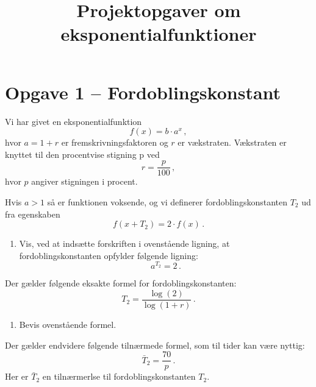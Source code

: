 \documentclass[12pt,oneside,a4paper]{article}
\title{Projektopgaver om eksponentialfunktioner}
\date{\vspace{-5ex}}
\theoremstyle{plain}
\begin{document}
\maketitle

\section*{Opgave 1 -- Fordoblingskonstant}
Vi har givet en eksponentialfunktion
\[
    f(x) = b\cdot a^x\,,
\]
hvor $a=1+r$ er fremskrivningsfaktoren og $r$ er vækstraten.
Vækstraten er knyttet til den procentvise stigning p ved
\[
    r = \frac{p}{100}\,,
\]
hvor $p$ angiver stigningen i procent.

Hvis $a>1$ så er funktionen voksende, og vi definerer fordoblingskonstanten
$T_2$ ud fra egenskaben
\[
    f(x+T_2) = 2\cdot f(x)\,.
\]

\begin{enumerate}[label=(\alph*)]
    \item Vis, ved at indsætte forskriften i ovenstående ligning, at 
fordoblingskonstanten opfylder følgende ligning:
\[
    a^{T_2} = 2\,.
\]
\end{enumerate}

Der gælder følgende eksakte formel for fordoblingskonstanten:
\[
    T_2 = \frac{\log(2)}{\log(1+r)}\,.
\]
\begin{enumerate}[label=(\alph*), resume]
    \item Bevis ovenstående formel.
\end{enumerate}

Der gælder endvidere følgende tilnærmede formel, som til tider kan være nyttig:
\[
    \bar T_2 = \frac{70}{p} \,.
\]
Her er $\bar T_2$ en tilnærmerlse til fordoblingskonstanten $T_2$.
\end{document}
